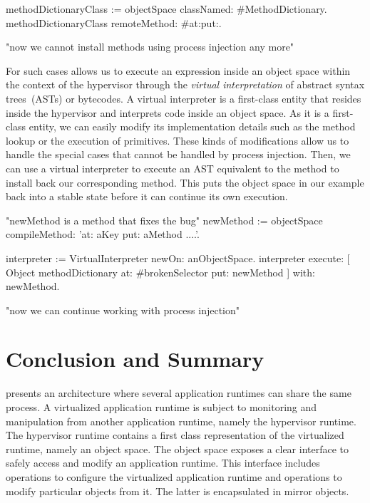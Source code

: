 \begin{code}
methodDictionaryClass := objectSpace classNamed: #MethodDictionary.
methodDictionaryClass remoteMethod: #at:put:.

"now we cannot install methods using process injection any more"
\end{code}

For such cases \Vtt allows us to execute an expression inside an object space within the context of the hypervisor through the \emph{virtual interpretation} of \eg abstract syntax trees~(ASTs) or bytecodes. A virtual interpreter is a first-class entity that resides inside the hypervisor and interprets code inside an object space. As it is a first-class entity, we can easily modify its implementation details such as the method lookup or the execution of primitives. These kinds of modifications allow us to handle the special cases that cannot be handled by process injection. Then, we can use a virtual interpreter to execute an AST equivalent to the  method to install back our corresponding method. This puts the object space in our example back into a stable state before it can continue its own execution.

\begin{code}
"newMethod is a method that fixes the bug"
newMethod := objectSpace compileMethod: 'at: aKey put: aMethod ....'.

interpreter := VirtualInterpreter newOn: anObjectSpace.
interpreter
	execute: [ Object methodDictionary at: #brokenSelector put: newMethod ]
	with: newMethod.
	
"now we can continue working with process injection"
\end{code}

\section{Conclusion and Summary}

\Vtt presents an architecture where several application runtimes can share the same process. A virtualized application runtime is subject to monitoring and manipulation from another application runtime, namely the hypervisor runtime. The hypervisor runtime contains a first class representation of the virtualized runtime, namely an object space. The object space exposes a clear interface to safely access and modify an application runtime. This interface includes operations to configure the virtualized application runtime and operations to modify particular objects from it. The latter is encapsulated in mirror objects.

